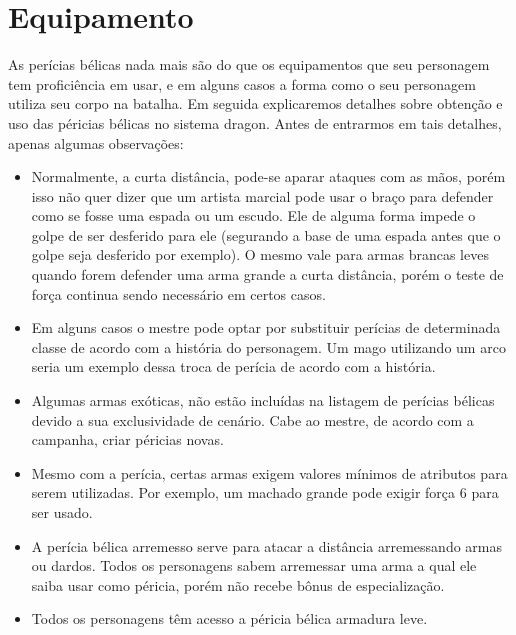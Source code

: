 
\chapter{Equipamento}
\label{Cap:pericia}

As perícias bélicas nada mais são do que os equipamentos que seu personagem tem proficiência em usar, e em alguns casos a forma como o seu personagem utiliza seu corpo na batalha. Em seguida explicaremos detalhes sobre obtenção e uso das péricias bélicas no sistema dragon. Antes de entrarmos em tais detalhes, apenas algumas observações:

\begin{itemize}
	\item Normalmente, a curta distância, pode-se aparar ataques com as mãos, porém isso não quer dizer que um artista marcial pode usar o braço para defender como se fosse uma espada ou um escudo. Ele de alguma forma impede o golpe de ser desferido para ele (segurando a base de uma espada antes que o golpe seja desferido por exemplo). O mesmo vale para armas brancas leves quando forem defender uma arma grande a curta distância, porém o teste de força continua sendo necessário em certos casos.

	\item Em alguns casos o mestre pode optar por substituir perícias de determinada classe de acordo com a história do personagem. Um mago utilizando um arco seria um exemplo dessa troca de perícia de acordo com a história. 

	\item Algumas armas exóticas, não estão incluídas na listagem de perícias bélicas devido a sua exclusividade de cenário. Cabe ao mestre, de acordo com a campanha, criar péricias novas. 
	
	\item Mesmo com a perícia, certas armas exigem valores mínimos de atributos para serem utilizadas. Por exemplo, um machado grande pode exigir força 6 para ser usado.

	\item A perícia bélica arremesso serve para atacar a distância arremessando armas ou dardos. Todos os personagens sabem arremessar uma arma a qual ele saiba usar como péricia, porém não recebe bônus de especialização. 

	\item Todos os personagens têm acesso a péricia bélica armadura leve.

\end{itemize}

